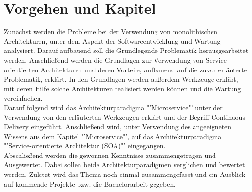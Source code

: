\section{Vorgehen und Kapitel}
\label{sec:vorgehen}
Zunächst werden die Probleme bei der Verwendung von monolithischen Architekturen, unter dem Aspekt der Softwareentwicklung und Wartung analysiert. Darauf aufbauend soll die Grundlegende Problematik herausgearbeitet werden. Anschließend werden die Grundlagen zur Verwendung von Service orientierten Architekturen und deren Vorteile, aufbauend auf die zuvor erläuterte Problematik, erklärt. In den Grundlagen werden außerdem Werkzeuge erklärt, mit deren Hilfe solche Architekturen realisiert werden können und die Wartung vereinfachen.
\\
Darauf folgend wird das Architekturparadigma "'Microservice"' unter der Verwendung von den erläuterten Werkzeugen erklärt und der Begriff Continuous Delivery eingeführt. Anschließend wird, unter Verwendung des angeeigneten Wissens aus dem Kapitel "'Microservice"', auf das Architekturparadigma "'Service-orientierte Architektur (SOA)"' eingegangen.
\\
Abschließend werden die gewonnen Kenntnisse zusammengetragen und Ausgewertet. Dabei sollen beide Architekturparadigmen verglichen und bewertet werden. Zuletzt wird das Thema noch einmal zusammengefasst und ein Ausblick auf kommende Projekte bzw. die Bachelorarbeit gegeben.